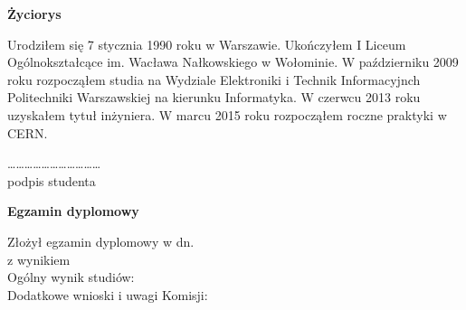 \vspace{10mm} 

\begin{center}
\textbf{Życiorys}
\end{center}

Urodziłem się 7 stycznia 1990 roku w Warszawie. 
Ukończyłem I Liceum Ogólnokształcące im. Wacława Nałkowskiego w Wołominie.
W październiku 2009 roku rozpocząłem studia na Wydziale Elektroniki i Technik Informacyjnch Politechniki Warszawskiej na kierunku Informatyka. W czerwcu 2013 roku uzyskałem tytuł inżyniera. W marcu 2015 roku rozpocząłem roczne praktyki w CERN. 

	 
\begin{flushright}

\dots\dots\dots\dots\dots\dots\dots\dots\dots\dots\dots \\
    \fontsize{9pt}{9pt}\selectfont
      podpis studenta\hspace{18mm}\null
\end{flushright}

\begin{flushleft}
\begin{center}
\vspace{15mm}
\textbf{Egzamin dyplomowy}
\vspace{5mm} \\
\end{center}

Złożył egzamin dyplomowy w dn. \manydots	 
\vspace{5mm} \\
z wynikiem \manydots 	
\vspace{5mm} \\
Ogólny wynik studiów: \manydots	 
\vspace{5mm} \\
Dodatkowe wnioski i uwagi Komisji: \manydots	 
\manydots \\ 
\vspace{5mm}
\manydots
\end{flushleft}
	
